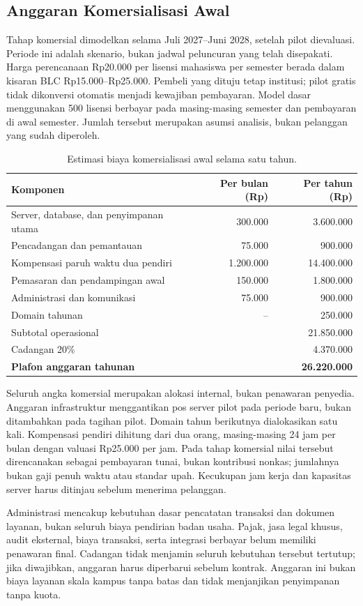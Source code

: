 \documentclass[12pt,a4paper,oneside]{report}
\begin{document}
\subsection{Anggaran Komersialisasi Awal}
Tahap komersial dimodelkan selama Juli 2027--Juni 2028, setelah pilot dievaluasi. Periode ini adalah skenario, bukan jadwal peluncuran yang telah disepakati. Harga perencanaan Rp20.000 per lisensi mahasiswa per semester berada dalam kisaran BLC Rp15.000--Rp25.000. Pembeli yang dituju tetap institusi; pilot gratis tidak dikonversi otomatis menjadi kewajiban pembayaran. Model dasar menggunakan 500 lisensi berbayar pada masing-masing semester dan pembayaran di awal semester. Jumlah tersebut merupakan asumsi analisis, bukan pelanggan yang sudah diperoleh.

\begin{table}[!htbp]
\centering\singlespacing
\caption{Estimasi biaya komersialisasi awal selama satu tahun.}
\label{tab:komersial}
\begin{tabularx}{\textwidth}{@{}>{\raggedright\arraybackslash}X r r@{}}
\toprule
\textbf{Komponen} & \textbf{Per bulan (Rp)} & \textbf{Per tahun (Rp)} \tabularnewline
\midrule
Server, database, dan penyimpanan utama & 300.000 & 3.600.000 \tabularnewline
Pencadangan dan pemantauan & 75.000 & 900.000 \tabularnewline
Kompensasi paruh waktu dua pendiri & 1.200.000 & 14.400.000 \tabularnewline
Pemasaran dan pendampingan awal & 150.000 & 1.800.000 \tabularnewline
Administrasi dan komunikasi & 75.000 & 900.000 \tabularnewline
Domain tahunan & -- & 250.000 \tabularnewline
\midrule
Subtotal operasional & & 21.850.000 \tabularnewline
Cadangan 20\% & & 4.370.000 \tabularnewline
\textbf{Plafon anggaran tahunan} & & \textbf{26.220.000} \tabularnewline
\bottomrule
\end{tabularx}
\end{table}
\FloatBarrier

Seluruh angka komersial merupakan alokasi internal, bukan penawaran penyedia. Anggaran infrastruktur menggantikan pos server pilot pada periode baru, bukan ditambahkan pada tagihan pilot. Domain tahun berikutnya dialokasikan satu kali. Kompensasi pendiri dihitung dari dua orang, masing-masing 24 jam per bulan dengan valuasi Rp25.000 per jam. Pada tahap komersial nilai tersebut direncanakan sebagai pembayaran tunai, bukan kontribusi nonkas; jumlahnya bukan gaji penuh waktu atau standar upah. Kecukupan jam kerja dan kapasitas server harus ditinjau sebelum menerima pelanggan.

Administrasi mencakup kebutuhan dasar pencatatan transaksi dan dokumen layanan, bukan seluruh biaya pendirian badan usaha. Pajak, jasa legal khusus, audit eksternal, biaya transaksi, serta integrasi berbayar belum memiliki penawaran final. Cadangan tidak menjamin seluruh kebutuhan tersebut tertutup; jika diwajibkan, anggaran harus diperbarui sebelum kontrak. Anggaran ini bukan biaya layanan skala kampus tanpa batas dan tidak menjanjikan penyimpanan tanpa kuota.
\end{document}
